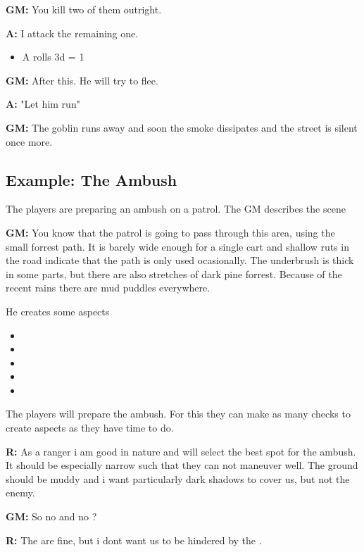 \documentclass[11pt]{article}
\begin{document}
{\textbf{GM:} You kill two of them outright.

\textbf{A:} I attack the remaining one.
\begin{itemize}
\item A rolls 3d = 1
\end{itemize}

\textbf{GM:} After this. He will try to flee.

\textbf{A:} "Let him run"

\textbf{GM:} The goblin runs away and soon the smoke dissipates and the street is silent once more.
\subsection{Example: The Ambush}
\label{sec:org823f825}

The players are preparing an ambush on a patrol. The GM describes the scene

\textbf{GM:} You know that the patrol is going to pass through this area, using the small forrest path. It is barely wide enough for a single cart and shallow ruts in the road indicate that the path is only used ocasionally. The underbrush is thick in some parts, but there are also stretches of dark pine forrest. Because of the recent rains there are mud puddles everywhere.

He creates some aspects
\begin{itemize}
\item {}
\item {}
\item {}
\item {}
\item {}
\end{itemize}

The players will prepare the ambush. For this they can make as many checks to create aspects as they have time to do.

\textbf{R:} As a ranger i am good in nature and will select the best spot for the ambush. It should be especially narrow such that they can not maneuver well. The ground should be muddy and i want particularly dark shadows to cover us, but not the enemy.

\textbf{GM:} So no  and no ?

\textbf{R:} The  are fine, but i dont want us to be hindered by the .

}
\end{document}
